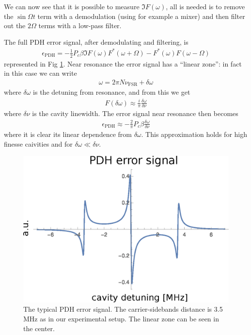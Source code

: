 We can now see that it is possible to measure $\Im{F(\omega)}$, all is needed is to remove the $\sin\Omega t$ term with a demodulation (using for example a mixer) and then filter out the $2\Omega$ terms with a low-pass filter.

The full PDH error signal, after demodulating and filtering, is
\begin{align}
	\epsilon_\mathrm{PDH} = -\frac{1}{2}P_c\beta \Im{F(\omega)F^*(\omega+\Omega)-F^*(\omega)F(\omega-\Omega)}
\end{align}
represented in Fig \ref{fig:errsignal}.
Near resonance the error signal has a ``linear zone'': in fact in this case we can write
\begin{align}
	\omega = 2\pi N \nu_\mathrm{FSR} + \delta\omega
\end{align}
where $\delta\omega$ is the detuning from resonance, and from this we get
\begin{align}
	F(\delta\omega) \approx \frac{i}{\pi}\frac{\delta\omega}{\delta\nu}
\end{align}
where $\delta\nu$ is the cavity linewidth. The error signal near resonance then becomes
\begin{align}
	\epsilon_\mathrm{PDH} \approx -\frac{2}{\pi}P_c \beta \frac{\delta\omega}{\delta\nu}
\end{align}
where it is clear its linear dependence from $\delta\omega$. This approximation holds for high finesse caivities and for $\delta\omega \ll \delta\nu$.

\begin{figure}
	\centering
	\includegraphics[width=0.8\linewidth]{images/errsignal.eps}
	\caption{The typical PDH error signal. The carrier-sidebands distance is 3.5\,MHz as in our experimental setup. The linear zone can be seen in the center.}
	\label{fig:errsignal}
\end{figure}

